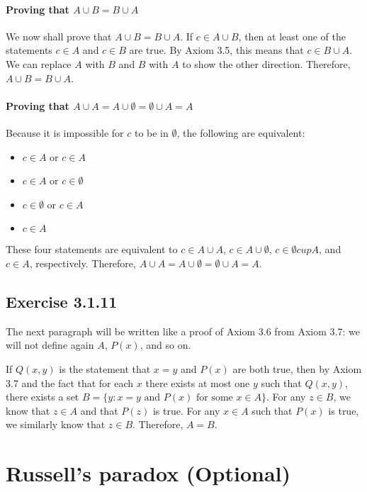 \documentclass[12pt, oneside]{book}
\begin{document}
	\paragraph*{Proving that $A \cup B = B \cup A$}
	
	We now shall prove that $A \cup B = B \cup A$. If $c \in A \cup B$, then at least one of the statements $c \in A$ and $c \in B$ are true. By Axiom 3.5, this means that $c \in B \cup A$. We can replace $A$ with $B$ and $B$ with $A$ to show the other direction. Therefore, $A \cup B = B \cup A$.
	
	\paragraph*{Proving that $A \cup A = A \cup \emptyset = \emptyset \cup A = A$}
	
	Because it is impossible for $c$ to be in $\emptyset$, the following are equivalent:
	\begin{itemize}
		\item $c \in A$ or $c \in A$
		\item $c \in A$ or $c \in \emptyset$
		\item $c \in \emptyset$ or $c \in A$
		\item $c \in A$
	\end{itemize}
	These four statements are equivalent to $c \in A \cup A$, $c \in A \cup \emptyset$, $c \in \emptyset cup A$, and $c \in A$, respectively. Therefore, $A \cup A = A \cup \emptyset = \emptyset \cup A = A$.
	
	\subsection*{Exercise 3.1.11}
	
	The next paragraph will be written like a proof of Axiom 3.6 from Axiom 3.7: we will not define again $A$, $P(x)$, and so on.
	
	If $Q(x, y)$ is the statement that $x = y$ and $P(x)$ are both true, then by Axiom 3.7 and the fact that for each $x$ there exists at most one $y$ such that $Q(x, y)$, there exists a set $B = \{y: x = y \text{ and } P(x) \text{ for some } x \in A\}$. For any $z \in B$, we know that $z \in A$ and that $P(z)$ is true. For any $x \in A$ such that $P(x)$ is true, we similarly know that $z \in B$. Therefore, $A = B$.
	
	\section{Russell's paradox (Optional)}
	
\end{document}
